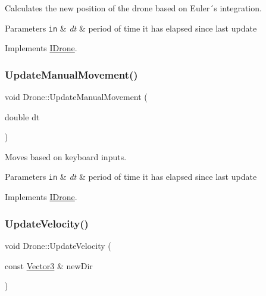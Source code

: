 Calculates the new position of the drone based on Euler´s integration. 


\begin{DoxyParams}[1]{Parameters}
\mbox{\tt in}  & {\em dt} & period of time it has elapsed since last update \\
\hline
\end{DoxyParams}


Implements \hyperlink{classIDrone_a6d840d60cda9a985b94af42ef54520b7}{I\+Drone}.

\mbox{\label{classDrone_aabfc6155cd0b8e14ae77c4659c090185}} 
\subsubsection{\texorpdfstring{Update\+Manual\+Movement()}{UpdateManualMovement()}}
{\footnotesize\ttfamily void Drone\+::\+Update\+Manual\+Movement (\begin{DoxyParamCaption}\item[{double}]{dt }\end{DoxyParamCaption})\hspace{0.3cm}{\ttfamily [virtual]}}



Moves based on keyboard inputs. 


\begin{DoxyParams}[1]{Parameters}
\mbox{\tt in}  & {\em dt} & period of time it has elapsed since last update \\
\hline
\end{DoxyParams}


Implements \hyperlink{classIDrone_a82486b4192f6ccf8b3d93fbb9101f2dd}{I\+Drone}.

\mbox{\label{classDrone_a8ecc9a70f1d3907a79be433bfa9b5d68}} 
\subsubsection{\texorpdfstring{Update\+Velocity()}{UpdateVelocity()}}
{\footnotesize\ttfamily void Drone\+::\+Update\+Velocity (\begin{DoxyParamCaption}\item[{const \hyperlink{classVector3}{Vector3} \&}]{new\+Dir }\end{DoxyParamCaption})\hspace{0.3cm}{\ttfamily [virtual]}}



